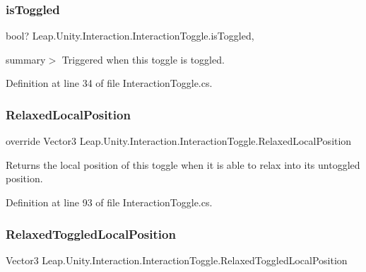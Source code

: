 \subsubsection{\texorpdfstring{isToggled}{isToggled}}
{\footnotesize\ttfamily bool? Leap.\+Unity.\+Interaction.\+Interaction\+Toggle.\+is\+Toggled\hspace{0.3cm}{\ttfamily [get]}, {\ttfamily [set]}}



summary$>$ Triggered when this toggle is toggled. 



Definition at line 34 of file Interaction\+Toggle.\+cs.

\mbox{\label{class_leap_1_1_unity_1_1_interaction_1_1_interaction_toggle_a5bea9ebaa3eacfbf60cec56df5c73f32}} 
\subsubsection{\texorpdfstring{RelaxedLocalPosition}{RelaxedLocalPosition}}
{\footnotesize\ttfamily override Vector3 Leap.\+Unity.\+Interaction.\+Interaction\+Toggle.\+Relaxed\+Local\+Position\hspace{0.3cm}{\ttfamily [get]}}



Returns the local position of this toggle when it is able to relax into its untoggled position. 



Definition at line 93 of file Interaction\+Toggle.\+cs.

\mbox{\label{class_leap_1_1_unity_1_1_interaction_1_1_interaction_toggle_a0aa93471870ce44e62c499437ad7f34c}} 
\subsubsection{\texorpdfstring{RelaxedToggledLocalPosition}{RelaxedToggledLocalPosition}}
{\footnotesize\ttfamily Vector3 Leap.\+Unity.\+Interaction.\+Interaction\+Toggle.\+Relaxed\+Toggled\+Local\+Position\hspace{0.3cm}{\ttfamily [get]}}



